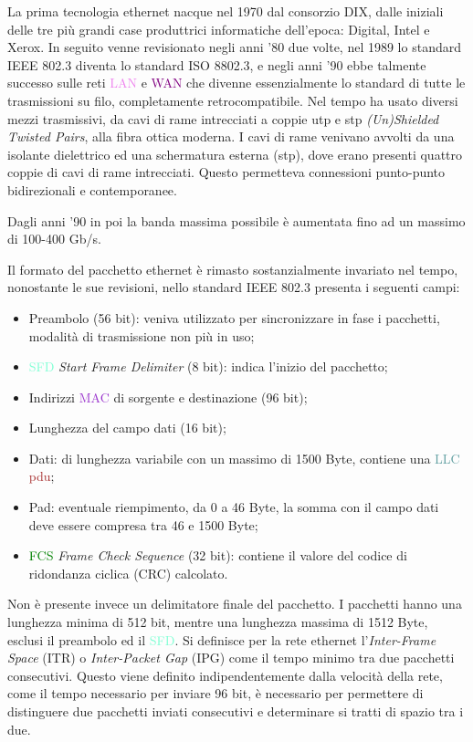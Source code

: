 \documentclass{article}
\numberwithin{equation}{subsection}
\begin{document}
La prima tecnologia ethernet nacque nel 1970 dal consorzio DIX, dalle iniziali delle tre più grandi case produttrici informatiche dell'epoca: Digital, Intel e Xerox. 
In seguito venne revisionato negli anni '80 due volte, nel 1989 lo standard IEEE 802.3 diventa lo standard ISO 8802.3, e negli anni '90 ebbe talmente successo sulle reti \textcolor{violet}{LAN} e \textcolor{purple}{WAN} che divenne essenzialmente lo 
standard di tutte le trasmissioni su filo, completamente retrocompatibile. 
Nel tempo ha usato diversi mezzi trasmissivi, da cavi di rame intrecciati a coppie utp e stp \textit{(Un)Shielded Twisted Pairs}, alla fibra ottica moderna. I cavi di rame venivano avvolti da una isolante dielettrico ed una schermatura esterna (stp), dove erano 
presenti quattro coppie di cavi di rame intrecciati. Questo permetteva connessioni punto-punto bidirezionali e contemporanee. 

Dagli anni '90 in poi la banda massima possibile è aumentata fino ad un massimo di 100-400 Gb/s. 



Il formato del pacchetto ethernet è rimasto sostanzialmente invariato nel tempo, nonostante le sue revisioni, nello standard IEEE 802.3 presenta i seguenti campi:
\begin{itemize}
    \item Preambolo (56 bit): veniva utilizzato per sincronizzare in fase i pacchetti, modalità di trasmissione non più in uso;
    \item \textcolor{Aquamarine}{SFD} \textit{Start Frame Delimiter} (8 bit): indica l'inizio del pacchetto;
    \item Indirizzi \textcolor{DarkOrchid}{MAC} di sorgente e destinazione (96 bit);
    \item Lunghezza del campo dati (16 bit);
    \item Dati: di lunghezza variabile con un massimo di 1500 Byte, contiene una \textcolor{CadetBlue}{LLC} \textcolor{Brown}{pdu};
    \item Pad: eventuale riempimento, da 0 a 46 Byte, la somma con il campo dati deve essere compresa tra 46 e 1500 Byte;
    \item \textcolor{Green}{FCS} \textit{Frame Check Sequence} (32 bit): contiene il valore del codice di ridondanza ciclica (CRC) calcolato. 
\end{itemize}

Non è presente invece un delimitatore finale del pacchetto. I pacchetti hanno una lunghezza minima di 512 bit, mentre una lunghezza massima di 1512 Byte, esclusi il preambolo ed il \textcolor{Aquamarine}{SFD}. Si definisce per la rete ethernet 
l'\textit{Inter-Frame Space} (ITR) o \textit{Inter-Packet Gap} (IPG) come il tempo minimo tra due pacchetti consecutivi. Questo viene definito indipendentemente dalla velocità della rete, come il tempo necessario per 
inviare 96 bit, è necessario per permettere di distinguere due pacchetti inviati consecutivi e determinare si tratti di spazio tra i due. 
\end{document}
